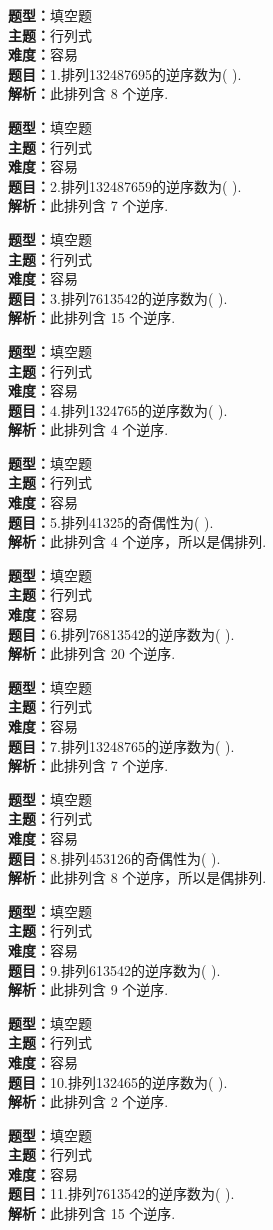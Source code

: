 \documentclass{ctexart}
\newenvironment{question}[5]{%
	\noindent\textbf{题型：}#1\\
	\textbf{主题：}#2\\
	\textbf{难度：}#3\\
	\textbf{题目：}#4\\
	\textbf{解析：}#5\\
	\vspace{1em}
}{}
\begin{document}
	\begin{question}
		{填空题}
		{行列式}
		{容易}
		{1.排列132487695的逆序数为(  ).}
		{此排列含 8 个逆序.}
	\end{question}
	
	\begin{question}
		{填空题}
		{行列式}
		{容易}
		{2.排列132487659的逆序数为(  ).}
		{此排列含 7 个逆序.}
	\end{question}
	
	\begin{question}
		{填空题}
		{行列式}
		{容易}
		{3.排列7613542的逆序数为(  ).}
		{此排列含 15 个逆序.}
	\end{question}
	
	\begin{question}
		{填空题}
		{行列式}
		{容易}
		{4.排列1324765的逆序数为(  ).}
		{此排列含 4 个逆序.}
	\end{question}
	
	\begin{question}
		{填空题}
		{行列式}
		{容易}
		{5.排列41325的奇偶性为(  ).}
		{此排列含 4 个逆序，所以是偶排列.}
	\end{question}
	
	\begin{question}
		{填空题}
		{行列式}
		{容易}
		{6.排列76813542的逆序数为(  ).}
		{此排列含 20 个逆序.}
	\end{question}
	
	\begin{question}
		{填空题}
		{行列式}
		{容易}
		{7.排列13248765的逆序数为(  ).}
		{此排列含 7 个逆序.}
	\end{question}
	
	\begin{question}
		{填空题}
		{行列式}
		{容易}
		{8.排列453126的奇偶性为(  ).}
		{此排列含 8 个逆序，所以是偶排列.}
	\end{question}
	
	\begin{question}
		{填空题}
		{行列式}
		{容易}
		{9.排列613542的逆序数为(  ).}
		{此排列含 9 个逆序.}
	\end{question}
	
	\begin{question}
		{填空题}
		{行列式}
		{容易}
		{10.排列132465的逆序数为(  ).}
		{此排列含 2 个逆序.}
	\end{question}
	
	
	\begin{question}
		{填空题}
		{行列式}
		{容易}
		{11.排列7613542的逆序数为(  ).}
		{此排列含 15 个逆序.}
	\end{question}
	
\end{document}
